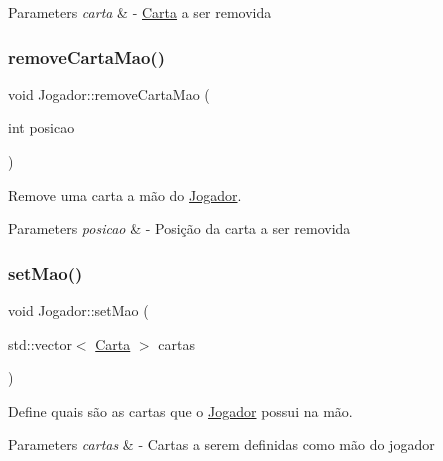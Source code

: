\begin{DoxyParams}{Parameters}
{\em carta} & -\/ \mbox{\hyperlink{class_carta}{Carta}} a ser removida \\
\hline
\end{DoxyParams}
\mbox{\label{class_jogador_a9c9a6a3b7460ccd81b800211ead01da2}} 
\subsubsection{\texorpdfstring{removeCartaMao()}{removeCartaMao()}\hspace{0.1cm}{\footnotesize\ttfamily [2/2]}}
{\footnotesize\ttfamily void Jogador\+::remove\+Carta\+Mao (\begin{DoxyParamCaption}\item[{int}]{posicao }\end{DoxyParamCaption})}



Remove uma carta a mão do \mbox{\hyperlink{class_jogador}{Jogador}}. 


\begin{DoxyParams}{Parameters}
{\em posicao} & -\/ Posição da carta a ser removida \\
\hline
\end{DoxyParams}
\mbox{\label{class_jogador_aa4efb1bca8f98a41f38397f8a2d34107}} 
\subsubsection{\texorpdfstring{setMao()}{setMao()}}
{\footnotesize\ttfamily void Jogador\+::set\+Mao (\begin{DoxyParamCaption}\item[{std\+::vector$<$ \mbox{\hyperlink{class_carta}{Carta}} $>$}]{cartas }\end{DoxyParamCaption})}



Define quais são as cartas que o \mbox{\hyperlink{class_jogador}{Jogador}} possui na mão. 


\begin{DoxyParams}{Parameters}
{\em cartas} & -\/ Cartas a serem definidas como mão do jogador \\
\hline
\end{DoxyParams}
\mbox{\label{class_jogador_a938aa676a62494ce8b0eff5698fcf7eb}} 
